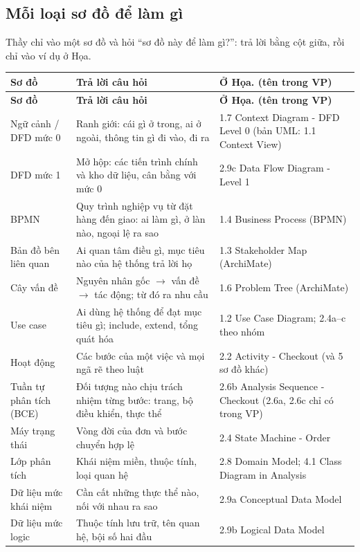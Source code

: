 \subsection{Mỗi loại sơ đồ để làm gì}\label{sec:qsodo}
Thầy chỉ vào một sơ đồ và hỏi ``sơ đồ này để làm gì?'': trả lời bằng cột giữa, rồi chỉ vào ví dụ ở Họa.
\begin{center}\small
\begin{longtable}{@{}P{3.7cm}P{6.3cm}P{5.9cm}@{}}
\toprule
\textbf{Sơ đồ} & \textbf{Trả lời câu hỏi} & \textbf{Ở Họa. (tên trong VP)}\\
\midrule\endfirsthead
\toprule
\textbf{Sơ đồ} & \textbf{Trả lời câu hỏi} & \textbf{Ở Họa. (tên trong VP)}\\
\midrule\endhead
Ngữ cảnh / DFD mức 0 & Ranh giới: cái gì ở trong, ai ở ngoài, thông tin gì đi vào, đi ra & 1.7 Context Diagram - DFD Level 0 (bản UML: 1.1 Context View)\\
DFD mức 1 & Mở hộp: các tiến trình chính và kho dữ liệu, cân bằng với mức 0 & 2.9c Data Flow Diagram - Level 1\\
BPMN & Quy trình nghiệp vụ từ đặt hàng đến giao: ai làm gì, ở làn nào, ngoại lệ ra sao & 1.4 Business Process (BPMN)\\
Bản đồ bên liên quan & Ai quan tâm điều gì, mục tiêu nào của hệ thống trả lời họ & 1.3 Stakeholder Map (ArchiMate)\\
Cây vấn đề & Nguyên nhân gốc $\to$ vấn đề $\to$ tác động; từ đó ra nhu cầu & 1.6 Problem Tree (ArchiMate)\\
Use case & Ai dùng hệ thống để đạt mục tiêu gì; include, extend, tổng quát hóa & 1.2 Use Case Diagram; 2.4a--c theo nhóm\\
Hoạt động & Các bước của một việc và mọi ngã rẽ theo luật & 2.2 Activity - Checkout (và 5 sơ đồ khác)\\
Tuần tự phân tích (BCE) & Đối tượng nào chịu trách nhiệm từng bước: trang, bộ điều khiển, thực thể & 2.6b Analysis Sequence - Checkout (2.6a, 2.6c chỉ có trong VP)\\
Máy trạng thái & Vòng đời của đơn và bước chuyển hợp lệ & 2.4 State Machine - Order\\
Lớp phân tích & Khái niệm miền, thuộc tính, loại quan hệ & 2.8 Domain Model; 4.1 Class Diagram in Analysis\\
Dữ liệu mức khái niệm & Cần cất những thực thể nào, nối với nhau ra sao & 2.9a Conceptual Data Model\\
Dữ liệu mức logic & Thuộc tính lưu trữ, tên quan hệ, bội số hai đầu & 2.9b Logical Data Model\\

\end{longtable}
\end{center}
